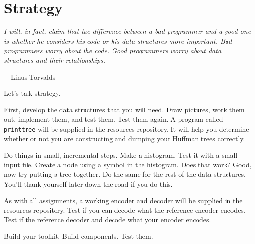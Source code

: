 \section{Strategy}

\epigraph{\emph{I will, in fact, claim that the difference between a bad
programmer and a good one is whether he considers his code or his data
structures more important. Bad programmers worry about the code. Good
programmers worry about data structures and their relationships.}}{---Linus
Torvalds}

\noindent Let's talk strategy.

First, develop the data structures that you will need. Draw pictures,
work them out, implement them, and test them. Test them again. A program
called \texttt{printtree} will be supplied in the resources repository. It
will help you determine whether or not you are constructing and dumping your Huffman
trees correctly.

Do things in small, incremental steps. Make a histogram. Test it with a
small input file. Create a node using a symbol in the histogram. Does
that work? Good, now try putting a tree together. Do the same for the
rest of the data structures. You'll thank yourself later down the road
if you do this.

As with all assignments, a working encoder and decoder will be supplied
in the resources repository. Test if you can decode what the reference
encoder encodes. Test if the reference decoder and decode what your
encoder encodes.

Build your toolkit. Build components. Test them.
